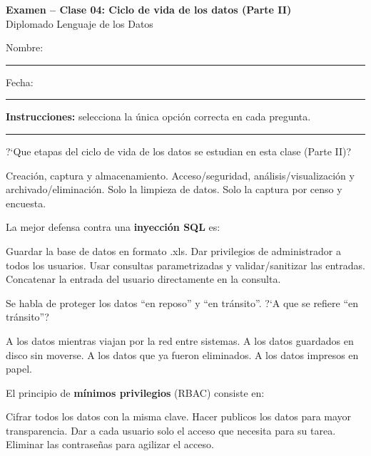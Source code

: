 \documentclass[12pt,addpoints]{exam}
\begin{document}
\begin{center}
  {\color{molMorado}\Large\bfseries Examen -- Clase 04:
   Ciclo de vida de los datos (Parte II)}\\[3pt]
  {\color{molTeal}\large Diplomado Lenguaje de los Datos}
\end{center}

\vspace{6pt}
\noindent Nombre: \rule{6cm}{0.4pt} \hfill Fecha: \rule{3cm}{0.4pt}

\vspace{6pt}
\noindent\textbf{Instrucciones:} selecciona la \'unica opci\'on correcta en cada
pregunta.

\vspace{4pt}
\hrule
\vspace{8pt}

\begin{questions}

\question[1] ?`Que etapas del ciclo de vida de los datos se estudian en esta
clase (Parte II)?
\begin{choices}
  \choice Creaci\'on, captura y almacenamiento.
  \CorrectChoice Acceso/seguridad, an\'alisis/visualizaci\'on y
    archivado/eliminaci\'on.
  \choice Solo la limpieza de datos.
  \choice Solo la captura por censo y encuesta.
\end{choices}

\question[1] La mejor defensa contra una \textbf{inyecci\'on SQL} es:
\begin{choices}
  \choice Guardar la base de datos en formato .xls.
  \choice Dar privilegios de administrador a todos los usuarios.
  \CorrectChoice Usar consultas parametrizadas y validar/sanitizar las entradas.
  \choice Concatenar la entrada del usuario directamente en la consulta.
\end{choices}

\question[1] Se habla de proteger los datos ``en reposo'' y ``en tr\'ansito''.
?`A que se refiere ``en tr\'ansito''?
\begin{choices}
  \CorrectChoice A los datos mientras viajan por la red entre sistemas.
  \choice A los datos guardados en disco sin moverse.
  \choice A los datos que ya fueron eliminados.
  \choice A los datos impresos en papel.
\end{choices}

\question[1] El principio de \textbf{m\'inimos privilegios} (RBAC) consiste en:
\begin{choices}
  \choice Cifrar todos los datos con la misma clave.
  \choice Hacer publicos los datos para mayor transparencia.
  \CorrectChoice Dar a cada usuario solo el acceso que necesita para su tarea.
  \choice Eliminar las contrase\~nas para agilizar el acceso.
\end{choices}


\end{questions}
\end{document}
